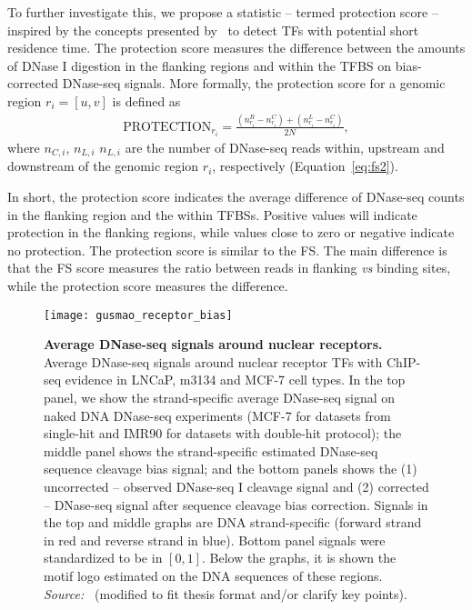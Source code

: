 To further investigate this, we propose a statistic -- termed protection score -- inspired by the concepts presented by~\cite{sung2014} to detect TFs with potential short residence time. The protection score measures the difference between the amounts of DNase I digestion in the flanking regions and within the TFBS on bias-corrected DNase-seq signals. More formally, the protection score for a genomic region $r_i = [u, v]$ is defined as
\begin{align}
  \label{eq:prot}
  \text{PROTECTION}_{r_i} = \frac{({n}^{R}_{r_i} - {n}^{C}_{r_i}) + ({n}^{L}_{r_i} - {n}^{C}_{r_i})}{2N},
\end{align}
where ${n}_{C,i}$, ${n}_{L,i}$  ${n}_{L,i}$ are the number of DNase-seq reads within, upstream and downstream of the genomic region $r_i$, respectively (Equation~\ref{eq:fs2}).

In short, the protection score indicates the average difference of DNase-seq counts in the flanking region and the within TFBSs. Positive values will indicate protection in the flanking regions, while values close to zero or negative indicate no protection. The protection score is similar to the FS. The main difference is that the FS score measures the ratio between reads in flanking \textit{vs} binding sites, while the protection score measures the difference.

\begin{figure}[h!]
\centering
\texttt{[image: gusmao\_receptor\_bias]}
\caption[Average DNase-seq signals around binding sites of nuclear receptors]{\textbf{Average DNase-seq signals around nuclear receptors.} Average DNase-seq signals around nuclear receptor TFs with ChIP-seq evidence in LNCaP, m3134 and MCF-7 cell types. In the top panel, we show the strand-specific average DNase-seq signal on naked DNA DNase-seq experiments (MCF-7 for datasets from single-hit and IMR90 for datasets with double-hit protocol); the middle panel shows the strand-specific estimated DNase-seq sequence cleavage bias signal; and the bottom panels shows the (1) uncorrected -- observed DNase-seq I cleavage signal and (2) corrected -- DNase-seq signal after sequence cleavage bias correction. Signals in the top and middle graphs are DNA strand-specific (forward strand in red and reverse strand in blue). Bottom panel signals were standardized to be in $[0,1]$. Below the graphs, it is shown the motif logo estimated on the DNA sequences of these regions. \emph{Source:~\cite{gusmao2016}} (modified to fit thesis format and/or clarify key points).}
\label{fig:gusmao_receptor_bias}
\end{figure}

